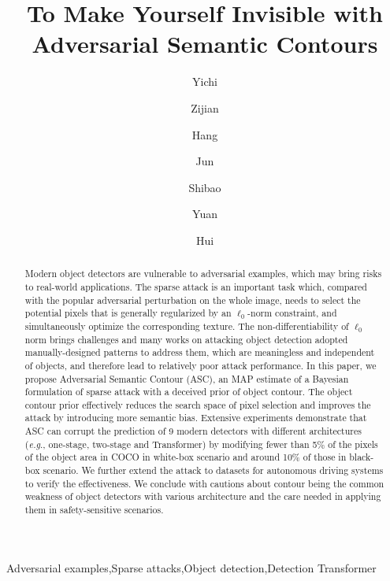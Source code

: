 \documentclass[times,twocolumn,final,authoryear]{elsarticle}
\def\onedot{.\null\xspace}
\def\eg{\emph{e.g}\onedot} \def\Eg{\emph{E.g}\onedot}
\begin{document}
\begin{frontmatter}

\title{To Make Yourself Invisible with Adversarial Semantic Contours}

\author[1]{Yichi }
\author[2]{Zijian }
\author[1]{Hang }
\author[1]{Jun }
\author[2]{Shibao }
\author[3]{Yuan }
\author[3]{Hui }


\address[1]{Department of Computer Science and Technology, Institute for Artificial Intelligence, THBI Lab, Tsinghua University, Beijing 100084, China}
\address[2]{Institute of Image Communication and Network Engineering, Shanghai Jiao Tong University, Shanghai 200240, China}
\address[3]{Alibaba Group, Hangzhou 311121, China}



\begin{abstract}
Modern object detectors are vulnerable to adversarial examples, which may bring risks to real-world applications. The sparse attack 
is an important
task which, compared with the popular adversarial perturbation on the whole image, needs to select the potential pixels that is generally regularized by an $\ell_0$-norm constraint, 
and simultaneously optimize the corresponding texture. The non-differentiability of $\ell_0$ norm brings challenges and many works on attacking object detection adopted manually-designed patterns to address them, which are meaningless and independent of objects, and therefore lead to relatively poor attack performance.
 In this paper, we propose Adversarial Semantic Contour (ASC), an MAP estimate of a Bayesian formulation of sparse attack with a deceived prior of object contour. The object contour prior effectively reduces the search space of pixel selection and improves the attack by introducing more semantic bias. Extensive experiments demonstrate that ASC can corrupt the prediction of 9 modern detectors with different architectures (\eg, one-stage, two-stage and Transformer) by modifying fewer than 5\% of the pixels of the object area in COCO in white-box scenario and around 10\% of those in black-box scenario. We further extend the attack to datasets for autonomous driving systems to verify the effectiveness. We conclude with cautions about contour being the common weakness of object detectors with various architecture and the care needed in applying them in safety-sensitive scenarios.
\end{abstract}

\begin{keyword}
\KWD Adversarial examples\sep Sparse attacks\sep Object detection\sep Detection Transformer

\end{keyword}

\end{frontmatter}
\end{document}
